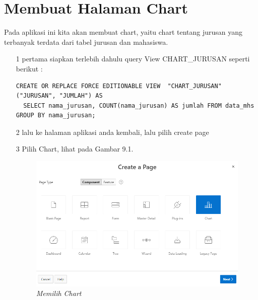 \section{Membuat Halaman Chart}
Pada aplikasi ini kita akan membuat chart, yaitu chart tentang jurusan yang terbanyak terdata dari tabel jurusan dan mahasiswa.
\begin{itemize}
    \item[1] pertama siapkan terlebih dahulu query View CHART\_JURUSAN seperti berikut :
        \begin{lstlisting}
CREATE OR REPLACE FORCE EDITIONABLE VIEW  "CHART_JURUSAN" ("JURUSAN", "JUMLAH") AS 
  SELECT nama_jurusan, COUNT(nama_jurusan) AS jumlah FROM data_mhs GROUP BY nama_jurusan;        
        \end{lstlisting}
    \item[2] lalu ke halaman aplikasi anda kembali, lalu pilih create page
    \item[3] Pilih Chart, lihat pada Gambar 9.1.
    \begin{figure}
        \centering
        \includegraphics[scale=0.5]{figures/chart/chart1.png}
        \caption{\textit{Memilih Chart}}
        \label{Pilih Chart}
    \end{figure}


\end{itemize}
